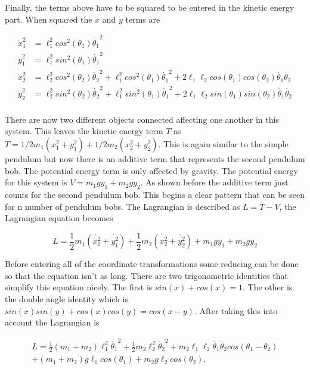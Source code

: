 \documentclass[runningheads]{llncs}
\begin{document}
Finally, the terms above have to be squared to be entered in the kinetic energy part. When squared the $\dot{x}$ and $\dot{y}$ terms are

\begin{align*}
 \dot{x}_{1}^{2} &= \ell_{1}^{2} cos^{2}(\theta_{1})\dot{\theta_{1}}^{2} \\
 \dot{y}_{1}^{2} &= \ell_{1}^{2} sin^{2}(\theta_{1})\dot{\theta_{1}} ^{2}\\ 
 \dot{x}_{2}^{2} &= \ell_{2}^{2}cos^{2}(\theta_{2})\dot{\theta_{2}}^{2} + \ell_{1}^{2}cos^{2}(\theta_{1})\dot{\theta_{1}}^{2} + 2\ell_{1}\ell_{2}cos(\theta_{1})cos(\theta_{2})\dot{\theta_{1}}\dot{\theta_{2}} \\
 \dot{y}_{2}^{2} &= \ell_{2}^{2}sin^{2}(\theta_{2})\dot{\theta_{2}}^{2} + \ell_{1}^{2}sin^{2}(\theta_{1})\dot{\theta_{1}}^{2} + 2\ell_{1}\ell_{2}sin(\theta_{1})sin(\theta_{2})\dot{\theta_{1}}\dot{\theta_{2}} \\ 
\end{align*}

There are now two different objects connected affecting one another in this system. This leaves the kinetic energy term $T$ as $T = 1/2m_{1}(\dot{x_{1}^{2}} + \dot{y_{1}^{2}}) + 1/2m_{2}(\dot{x_{2}^{2}} + \dot{y_{2}^{2}})$. This is again similar to the simple pendulum but now there is an additive term that represents the second pendulum bob. The potential energy term is only affected by gravity. The potential energy for this system is $V = m_{1}gy_{1} + m_{2}gy_{2}$. As shown before the additive term just counts for the second pendulum bob. This begins a clear pattern that can be seen for n number of pendulum bobs. The Lagrangian is described as $L = T - V$, the Lagrangian equation becomes 

\begin{equation}
    L = \frac{1}{2}m_{1}(\dot{x_{1}^{2}} + \dot{y_{1}^{2}}) + \frac{1}{2}m_{2}(\dot{x_{2}^{2}} + \dot{y_{2}^{2}}) + m_{1}gy_{1} + m_{2}gy_{2}
\end{equation}

Before entering all of the coordinate transformations some reducing can be done so that the equation isn't as long. There are two trigonometric identities that simplify this equation nicely. The first is $sin(x) + cos(x) = 1$. The other is the double angle identity which is $sin(x)sin(y) + cos(x)cos(y) = cos(x - y)$. After taking this into account the Lagrangian is 

\begin{multline}
    L = \frac{1}{2}(m_{1} + m_{2}) \ell_{1}^{2}\dot{\theta_{1}}^{2} + \frac{1}{2}m_{2}\ell_{2}^{2}\dot{\theta_{2}}^{2} + m_{2}\ell_{1}\ell_{2}  \dot{\theta_{1}}\dot{\theta_{2}}cos(\theta_{1} - \theta_{2})\\ + (m_1 + m_2)g\ell_{1}cos(\theta_{1}) + m_{2}g\ell_{2}cos(\theta_{2}).
\end{multline}
\end{document}
